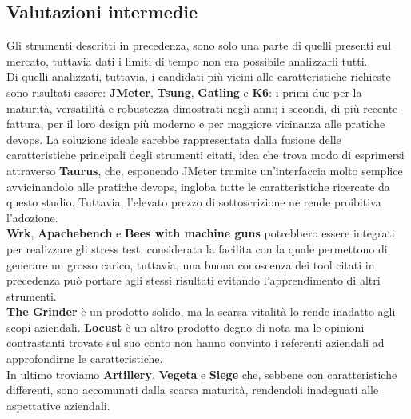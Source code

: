 \subsection{Valutazioni intermedie}
Gli strumenti descritti in precedenza, sono solo una parte di quelli presenti sul mercato, tuttavia dati i limiti di tempo non era possibile analizzarli tutti. \\
Di quelli analizzati, tuttavia, i candidati più vicini alle caratteristiche richieste sono risultati essere: \textbf{JMeter}, \textbf{Tsung}, \textbf{Gatling} e \textbf{K6}: i primi due per la maturità, versatilità e robustezza dimostrati negli anni; i secondi, di più recente fattura, per il loro design più moderno e per maggiore vicinanza alle pratiche \gls{devops}.
La soluzione ideale sarebbe rappresentata dalla fusione delle caratteristiche principali degli strumenti citati, idea che trova modo di esprimersi attraverso \textbf{Taurus}, che, esponendo JMeter tramite un'interfaccia molto semplice avvicinandolo alle pratiche \gls{devops}, ingloba tutte le caratteristiche ricercate da questo studio. Tuttavia, l'elevato prezzo di sottoscrizione ne rende proibitiva l'adozione. \\
\textbf{Wrk}, \textbf{Apachebench} e \textbf{Bees with machine guns} potrebbero essere integrati per realizzare gli stress test, considerata la facilita con la quale permettono di generare un grosso carico, tuttavia, una buona conoscenza dei tool citati in precedenza può portare agli stessi risultati evitando l'apprendimento di altri strumenti. \\
\textbf{The Grinder} è un prodotto solido, ma la scarsa vitalità lo rende inadatto agli scopi aziendali.
\textbf{Locust} è un altro prodotto degno di nota ma le opinioni contrastanti trovate sul suo conto non hanno convinto i referenti aziendali ad approfondirne le caratteristiche. \\
In ultimo troviamo \textbf{Artillery}, \textbf{Vegeta} e \textbf{Siege} che, sebbene con caratteristiche differenti, sono accomunati dalla scarsa maturità, rendendoli inadeguati alle aspettative aziendali.
\newpage
